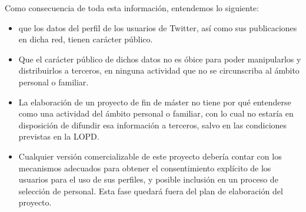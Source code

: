 Como consecuencia de toda esta información, entendemos lo siguiente:
\begin{itemize}
\item que los datos del perfil de los usuarios de Twitter, así como sus publicaciones en dicha red,
tienen carácter público.
\item Que el carácter público de dichos datos no es óbice para poder manipularlos y distribuirlos
a terceros, en ninguna actividad que no se circunscriba al ámbito personal o familiar.
\item La elaboración de un proyecto de fin de máster no tiene por qué entenderse como una 
actividad del ámbito personal o familiar, con lo cual no estaría en disposición de difundir esa información
a terceros, salvo en las condiciones previstas en la LOPD.
\item Cualquier versión comercializable de este proyecto debería contar con los mecanismos
adecuados para obtener el consentimiento explícito de los usuarios para el uso de sus perfiles, 
y posible inclusión en un proceso de selección de personal. Esta fase quedará fuera del plan de elaboración
del proyecto.
\end{itemize}

